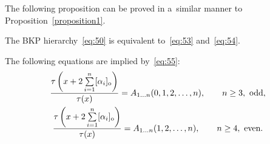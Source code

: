 The following proposition can be proved in a~similar manner to Proposition~\ref{proposition1}.
\begin{proposition}\label{proposition7}
The BKP hierarchy~\eqref{eq:50} is equivalent to~\eqref{eq:53} and~\eqref{eq:54}.
\end{proposition}
\begin{proposition}\label{proposition8}
The following equations are implied by~\eqref{eq:55}:
\begin{gather}
\frac{\tau\left(x+2\sum\limits_{i=1}^{n}[\alpha_i]_{\rm o}\right)}{\tau(x)}=A_{1\dots n}(0,1,2,\dots,n),\qquad n\ge3, \ \text{odd},
\label{eq:66}
\\
\frac{\tau\left(x+2\sum\limits_{i=1}^{n}[\alpha_i]_{\rm o}\right)}{\tau(x)}=A_{1\dots n}(1,2,\dots,n),\qquad n\ge4, \ \text{even}.
\label{eq:67}
\end{gather}
\end{proposition}

